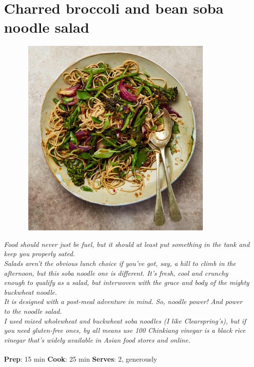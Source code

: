 \documentclass{book}
\begin{document}
\section{Charred broccoli and bean soba noodle salad}
\begin{figure}
\centering\includegraphics[width=10cm,height=10cm,keepaspectratio]{Recipe_Pictures/Charred_broccoli_and_bean_soba_noodle_salad.png}
\end{figure}
\emph{Food should never just be fuel, but it should at least put something in the tank and keep you properly sated.\\ 
Salads aren’t the obvious lunch choice if you’ve got, say, a hill to climb in the afternoon, but this soba noodle one is different. It’s fresh, cool and crunchy enough to qualify as a salad, but interwoven with the grace and body of the mighty buckwheat noodle.\\ 
It is designed with a post-meal adventure in mind. So, noodle power! And power to the noodle salad.\\ 
I used mixed wholewheat and buckwheat soba noodles (I like Clearspring’s), but if you need gluten-free ones, by all means use 100%
Chinkiang vinegar is a black rice vinegar that’s widely available in Asian food stores and online.}\\\\ 
\textbf{Prep}: 15 min
\textbf{Cook}: 25 min
\textbf{Serves}: 2, generously
\end{document}
